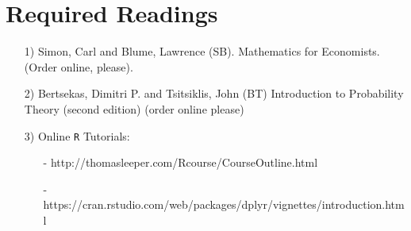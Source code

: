 \documentclass[11pt,letterpaper]{article}
\numberwithin{equation}{section}
\begin{document}




\section*{Required Readings}
\begin{itemize}
\item[1)]  Simon, Carl and Blume, Lawrence (SB).  Mathematics for Economists. (Order online, please).
\item[2)]  Bertsekas, Dimitri P. and Tsitsiklis, John (BT) Introduction to Probability Theory (second edition) (order online please)
\item[3)] Online {\tt R} Tutorials:
\begin{itemize}
\item[-] http://thomasleeper.com/Rcourse/CourseOutline.html
\item[-] https://cran.rstudio.com/web/packages/dplyr/vignettes/introduction.html
\end{itemize}
\end{itemize}
\end{document}
